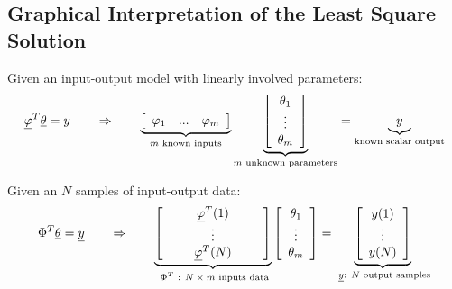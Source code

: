\newpage
\subsection{Graphical Interpretation of the Least Square Solution}

Given an input-output model with linearly involved parameters:
\begin{align}
\underline{\varphi}^T \underline{\theta}
= y
\quad\quad\Rightarrow\quad\quad
\underbrace{ 
\left[ \begin{array}{c c c } 
\varphi_1 & ... & \varphi_m
\end{array} \right] }_{ m \text{ known inputs} }
\underbrace{ \left[ \begin{array}{c} 
\theta_1 \\ \vdots \\ \theta_m
\end{array} \right] }_{ m \text{ unknown parameters} } = 
\underbrace{y}_{\text{known scalar output} }
\end{align}

Given an $N$ samples of input-output data:
\begin{align}
\Phi^T \underline{\theta}
= \underline{y}
\quad\quad\Rightarrow\quad\quad
\underbrace{ 
\left[ \begin{array}{c c c c c } 
&& \underline{\varphi}^T(1) && \\
&& \vdots & \\
&& \underline{\varphi}^T(N) && \\
\end{array} \right] }_{\text{ $\Phi^T$ : $N \times m$  inputs data} }
\left[ \begin{array}{c} 
\theta_1 \\ \vdots \\ \theta_m
\end{array} \right]
 = \underbrace{ \left[ \begin{array}{c}  
 y(1) \\ \vdots \\ y(N)\\ 
 \end{array} \right] }_{ \text{ $\underline{y}$: $N$ output samples} } 
\end{align}

